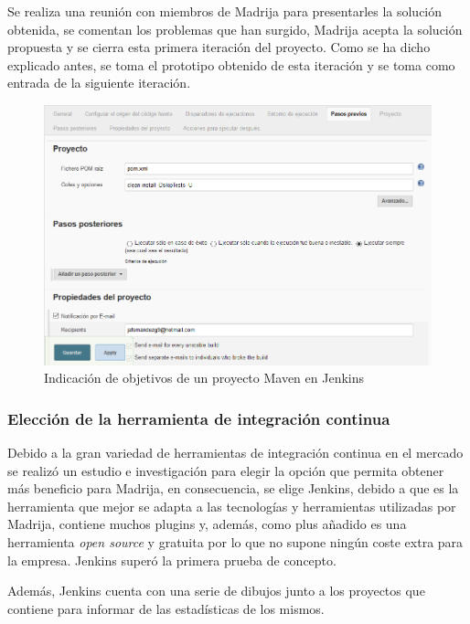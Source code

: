 Se realiza una reunión con miembros de \ac{Madrija} para presentarles la solución obtenida, se comentan los problemas que han surgido, \ac{Madrija} acepta la solución propuesta y se cierra esta primera iteración del proyecto. Como se ha dicho explicado antes, se toma el prototipo obtenido de esta iteración y se toma como entrada de la siguiente iteración.

\begin{figure}[!h]
\centering
   \includegraphics[width=14cm]{JenkinsMateriales.PNG}
\caption{Indicación de objetivos de un proyecto Maven en Jenkins}
\end{figure}

\subsubsection{Elección de la herramienta de integración continua}

Debido a la gran variedad de herramientas de integración continua en el mercado se realizó un estudio e investigación para elegir la opción que permita obtener más beneficio para \ac{Madrija}, en consecuencia, se elige Jenkins, debido a que es la herramienta que mejor se adapta a las tecnologías y herramientas utilizadas por \ac{Madrija}, contiene muchos plugins y, además, como plus añadido es una herramienta \textit{open source} y gratuita por lo que no supone ningún coste extra para la empresa. Jenkins superó la primera prueba de concepto.

\clearpage

Además, Jenkins cuenta con una serie de dibujos junto a los proyectos que contiene para informar de las estadísticas de los mismos.

